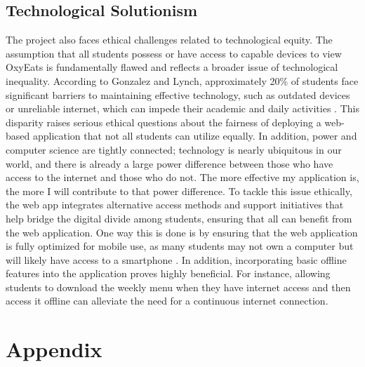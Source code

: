 \documentclass[10pt,twocolumn]{article}
\begin{document}
\subsection{Technological Solutionism}
The project also faces ethical challenges related to technological equity. The assumption that all students possess or have access to capable devices to view OxyEats is fundamentally flawed and reflects a broader issue of technological inequality. According to Gonzalez and Lynch, approximately 20\% of students face significant barriers to maintaining effective technology, such as outdated devices or unreliable internet, which can impede their academic and daily activities \cite{Gonzales2020}. This disparity raises serious ethical questions about the fairness of deploying a web-based application that not all students can utilize equally. In addition, power and computer science are tightly connected; technology is nearly ubiquitous in our world, and there is already a large power difference between those who have access to the internet and those who do not. The more effective my application is, the more I will contribute to that power difference. To tackle this issue ethically, the web app integrates alternative access methods and support initiatives that help bridge the digital divide among students, ensuring that
all can benefit from the web application. One way this is done is by ensuring that the web application is fully optimized for mobile use, as many students may not own a computer but will likely have access to a smartphone \cite{Wang2023}. In addition, incorporating basic offline features into the application proves highly beneficial. For instance, allowing students to download the weekly menu when they have internet access and then access it offline can alleviate the need for a continuous internet connection.

\section{Appendix}
\appendix
\end{document}
